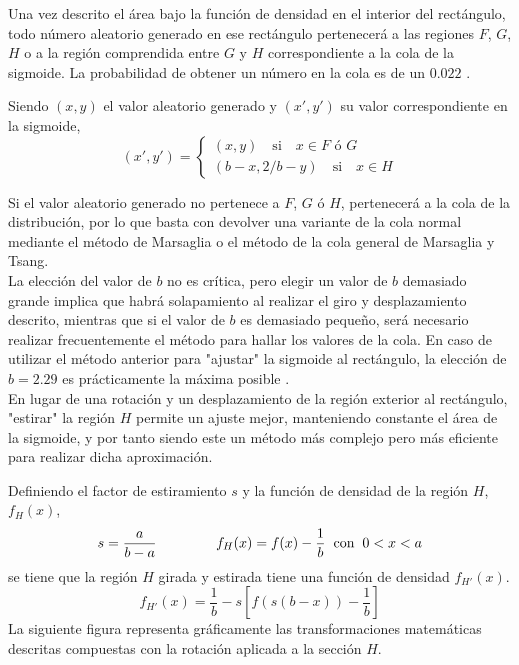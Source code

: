 \documentclass[a4paper,12pt]{article}
\begin{document}
	Una vez descrito el área bajo la función de densidad en el interior del rectángulo, todo número aleatorio generado en ese rectángulo pertenecerá a las regiones $F$, $G$, $H$ o a la región comprendida entre $G$ y $H$ correspondiente a la cola de la sigmoide. La probabilidad de obtener un número en la cola es de un $0.022$ \cite{monty-python}.
	
	Siendo $(x,y)$ el valor aleatorio generado y $(x',y')$ su valor correspondiente en la sigmoide, 
	$$
	(x',y') = 
	\begin{cases}
		(x,y) \quad \text{si} \quad x\in F \text{ ó } G \\
		(b-x,2/b-y) \quad \text{si} \quad x \in H
	\end{cases}
	$$  
	
	Si el valor aleatorio generado no pertenece a $F$, $G$ ó $H$, pertenecerá a la cola de la distribución, por lo que basta con devolver una variante de la cola normal mediante el método de Marsaglia o el método de la cola general de Marsaglia y Tsang.\\
		
	La elección del valor de $b$ no es crítica, pero elegir un valor de $b$ demasiado grande implica que habrá solapamiento al realizar el giro y desplazamiento descrito, mientras que si el valor de $b$ es demasiado pequeño, será necesario realizar frecuentemente el método para hallar los valores de la cola.
	En caso de utilizar el método anterior para "ajustar" la sigmoide al rectángulo, la elección de $b=2.29$ es prácticamente la máxima posible \cite{monty-python}. \\
		
	En lugar de una rotación y un desplazamiento de la región exterior al rectángulo, "estirar" la región $H$ permite un ajuste mejor, manteniendo constante el área de la sigmoide, y por tanto siendo este un método más complejo pero más eficiente para realizar dicha aproximación. 
	
	Definiendo el factor de estiramiento $s$ y la función de densidad de la región $H$, $f_H(x)$, 
	$$s=\dfrac{a}{b-a} \hspace{1.5cm} f_H(x)=f(x)-\dfrac{1}{b} \hspace{2mm} \text{con} \hspace{2mm} 0<x<a $$
	se tiene que la región $H$ girada y estirada tiene una función de densidad $f_{H'}(x)$.
	$$ f_{H'}(x) = \dfrac{1}{b} - s  \left[ f(s (b-x) ) -\dfrac{1}{b} \right] $$ 
	La siguiente figura representa gráficamente las transformaciones matemáticas descritas compuestas con la rotación aplicada a la sección $H$. 
	
\end{document}

